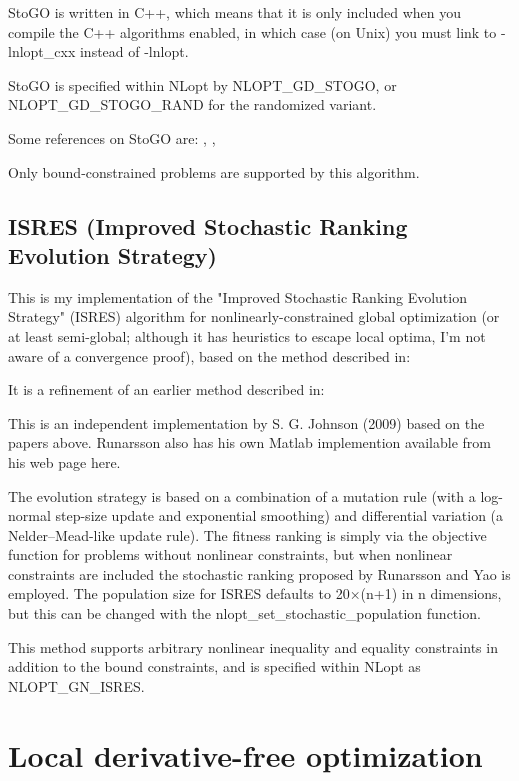 StoGO is written in C++, which means that it is only included when you compile the C++ algorithms enabled, in which case (on Unix) you must link to -lnlopt\_cxx instead of -lnlopt. 

StoGO is specified within NLopt by NLOPT\_GD\_STOGO, or NLOPT\_GD\_STOGO\_RAND for the randomized variant. 

Some references on StoGO are: \cite{Gudmundsson1998}, \cite{Madsen_1998}, \cite{Zertchaninov1998}


Only bound-constrained problems are supported by this algorithm. 





\subsection{ISRES (Improved Stochastic Ranking Evolution Strategy)}
This is my implementation of the "Improved Stochastic Ranking Evolution Strategy" (ISRES) algorithm for nonlinearly-constrained global optimization (or at least semi-global; although it has heuristics to escape local optima, I'm not aware of a convergence proof), based on the method described in: \cite{Runarsson_2005}


It is a refinement of an earlier method described in: \cite{Runarsson_2000}



This is an independent implementation by S. G. Johnson (2009) based on the papers above. Runarsson also has his own Matlab implemention available from his web page here. 

The evolution strategy is based on a combination of a mutation rule (with a log-normal step-size update and exponential smoothing) and differential variation (a Nelder–Mead-like update rule). The fitness ranking is simply via the objective function for problems without nonlinear constraints, but when nonlinear constraints are included the stochastic ranking proposed by Runarsson and Yao is employed. The population size for ISRES defaults to 20×(n+1) in n dimensions, but this can be changed with the nlopt\_set\_stochastic\_population function. 

This method supports arbitrary nonlinear inequality and equality constraints in addition to the bound constraints, and is specified within NLopt as NLOPT\_GN\_ISRES. 





\section{Local derivative-free optimization}
\label{LocalDerivativeFreeOptimization}

